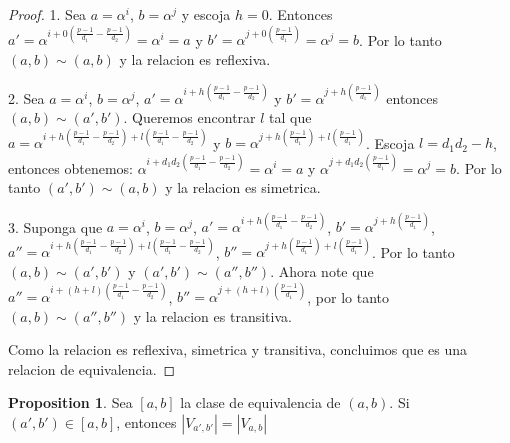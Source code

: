 \documentclass{article}
\theoremstyle{definition}
\newtheorem{prop}[theorem]{Proposition}
\theoremstyle{remark}
\numberwithin{equation}{section}
\begin{document}
\begin{proof}
  
  1. Sea $a=\alpha^i$, $b=\alpha^j$ y escoja $h=0$. Entonces $a' = \alpha^{i+0(\frac{p-1}{d_1}-\frac{p-1}{d_2})} = \alpha^i = a$ y $b' = \alpha^{j+0(\frac{p-1}{d_1})} = \alpha^j = b$. Por lo tanto $(a,b) \sim (a,b)$ y la relacion es reflexiva.

  2. Sea $a = \alpha^i$, $b=\alpha^j$, $a' = \alpha^{i+h(\frac{p-1}{d_1}-\frac{p-1}{d_2})}$ y $b' = \alpha^{j+h(\frac{p-1}{d_1})}$ entonces $(a,b) \sim (a',b')$. Queremos encontrar $l$ tal que $a = \alpha^{i+h(\frac{p-1}{d_1}-\frac{p-1}{d_2})+l(\frac{p-1}{d_1}-\frac{p-1}{d_2})}$ y $b = \alpha^{j+h(\frac{p-1}{d_1})+l(\frac{p-1}{d_1})}$. Escoja $l=d_1d_2-h$, entonces obtenemos: $\alpha^{i+d_1d_2(\frac{p-1}{d_1}-\frac{p-1}{d_2})} = \alpha^i = a$ y $\alpha^{j+d_1d_2(\frac{p-1}{d_1})} = \alpha^j = b$. Por lo tanto $(a',b') \sim (a,b) $ y la relacion es simetrica.

  3. Suponga que $a = \alpha^i$, $b=\alpha^j$, $a' = \alpha^{i+h(\frac{p-1}{d_1}-\frac{p-1}{d_2})}$, $b' = \alpha^{j+h(\frac{p-1}{d_1})}$, $a'' = \alpha^{i+h(\frac{p-1}{d_1}-\frac{p-1}{d_2})+l(\frac{p-1}{d_1}-\frac{p-1}{d_2})}$, $b'' = \alpha^{j+h(\frac{p-1}{d_1})+l(\frac{p-1}{d_1})}$. Por lo tanto $(a,b) \sim (a',b')$ y $(a',b') \sim (a'',b'')$. Ahora note que $a'' = \alpha^{i+(h+l)(\frac{p-1}{d_1}-\frac{p-1}{d_2})}$, $b'' = \alpha^{j+(h+l)(\frac{p-1}{d_1})}$, por lo tanto $(a,b) \sim (a'',b'')$ y la relacion es transitiva.

  Como la relacion es reflexiva, simetrica y transitiva, concluimos que es una relacion de equivalencia.

\end{proof}

\begin{prop}
  
  Sea $[a, b]$ la clase de equivalencia de $(a, b)$. Si $(a', b') \in [a, b]$, entonces 
  $|V_{a', b'}| = |V_{a, b}|$

\end{prop}
\end{document}
